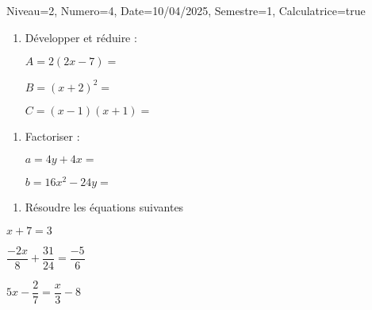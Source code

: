 \documentclass[a4paper,12pt]{article}
\begin{document}
	\begin{Maquette}[DS]{Niveau=2, Numero=4, Date=10/04/2025, Semestre=1, Calculatrice=true}
		
		\begin{exercice}
			\begin{enumerate}
				\item{} Développer et réduire :
				
				$
				A=2\left(2x-7\right)=$\anserline[2]
				
				$
				B=\left(x+2\right)^{2}=$
				\anserline[2]
				
				$C=\left(x-1\right)\left(x+1\right)=$\anserline[2]
				
			\end{enumerate}
		\end{exercice}
		
		\begin{exercice}
			\begin{enumerate}
				\item{} Factoriser :
				
				$a=4y+4x=$\anserline[2]
				
				$b=16x^{2}-24y=$\anserline[2]
				
			\end{enumerate}
		\end{exercice}
		
		\begin{exercice}
			\begin{enumerate}
				\item{} Résoudre les équations suivantes 
			\end{enumerate}
			\begin{multicols}{3}
				\(x+7=3\)\newline
				\anserline[8]
				\columnbreak
				
				\(\dfrac{-2x}{8}+\dfrac{31}{24}=\dfrac{-5}{6}\)\newline
				\anserline[8]
				\columnbreak
				
				\(5x-\dfrac{2}{7}=\dfrac{x}{3}-8\)\newline
				\anserline[8]
			\end{multicols}
		\end{exercice}
		
	
	\end{Maquette}
\end{document}
